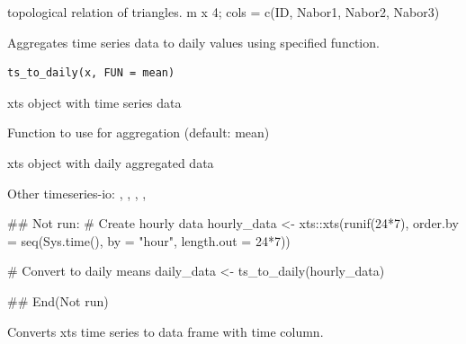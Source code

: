 \documentclass[a4paper]{book}
\begin{document}
%
\begin{Value}
topological relation of triangles. m x 4; cols = c(ID, Nabor1, Nabor2, Nabor3)
\end{Value}
%
\begin{Description}\relax
Aggregates time series data to daily values using specified function.
\end{Description}
%
\begin{Usage}
\begin{verbatim}
ts_to_daily(x, FUN = mean)
\end{verbatim}
\end{Usage}
%
\begin{Arguments}
\begin{ldescription}
\item[\code{x}] xts object with time series data

\item[\code{FUN}] Function to use for aggregation (default: mean)
\end{ldescription}
\end{Arguments}
%
\begin{Value}
xts object with daily aggregated data
\end{Value}
%
\begin{SeeAlso}\relax
Other timeseries-io: 
,
,
,
,
\end{SeeAlso}
%
\begin{Examples}
\begin{ExampleCode}
## Not run: 
# Create hourly data
hourly_data <- xts::xts(runif(24*7), 
                       order.by = seq(Sys.time(), by = "hour", length.out = 24*7))

# Convert to daily means
daily_data <- ts_to_daily(hourly_data)

## End(Not run)
\end{ExampleCode}
\end{Examples}
%
\begin{Description}\relax
Converts xts time series to data frame with time column.
\end{Description}
\end{document}
